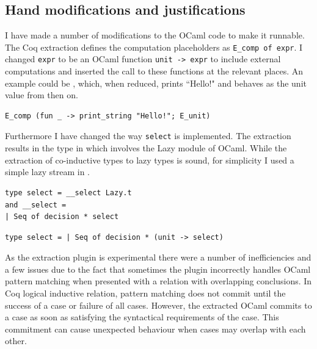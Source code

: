 \documentclass[12pt,twoside,notitlepage]{report}
\theoremstyle{plain}%
\theoremstyle{definition}
\theoremstyle{remark}
\begin{document}
\subsection{Hand modifications and justifications}
I have made a number of modifications to the OCaml code to make it runnable. The Coq extraction defines the computation placeholders as \lstinline|E_comp of expr|. I changed \lstinline|expr| to be an OCaml function \lstinline|unit -> expr| to include external computations and inserted the call to these functions at the relevant places. An example could be , which, when reduced, prints ``Hello!" and behaves as the unit value from then on. 
\begin{lstlisting}[caption={OCaml computation placeholder example}, label={lst:ocaml_comp_place2}]
E_comp (fun _ -> print_string "Hello!"; E_unit)
\end{lstlisting}

Furthermore I have changed the way \verb|select| is implemented. The extraction results in the type in  which involves the Lazy module of OCaml. While the extraction of co-inductive types to lazy types is sound, for simplicity I used a simple lazy stream in . 


\vspace{3mm}
\begin{minipage}{\linewidth}

\begin{lstlisting}[caption={OCaml lazy select}, label={lst:ocamllazystar}]
type select = __select Lazy.t
and __select =
| Seq of decision * select
\end{lstlisting}

\end{minipage}

\begin{minipage}{\linewidth}

\begin{lstlisting}[caption={OCaml stream select}, label={lst:ocamlstreamstar}]
type select = | Seq of decision * (unit -> select) 
\end{lstlisting}

\end{minipage}

As the extraction plugin is experimental there were a number of inefficiencies and a few issues due to the fact that sometimes the plugin incorrectly handles OCaml pattern matching when presented with a relation with overlapping conclusions. In Coq logical inductive relation, pattern matching does not commit until the success of a case or failure of all cases. However, the extracted OCaml commits to a case as soon as satisfying the syntactical requirements of the case. This commitment can cause unexpected behaviour when cases may overlap with each other.
\end{document}
